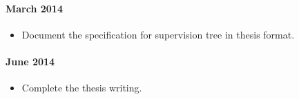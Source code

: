 \documentclass[11pt, a4paper, authoryear]{article}
\begin{document}
\paragraph{March 2014}
\begin{itemize}
  \item Document the specification for supervision tree in thesis format. 
\end{itemize}

\paragraph{June 2014}
\begin{itemize}
  \item Complete the thesis writing.
\end{itemize}




\appendix
%


\end{document}
